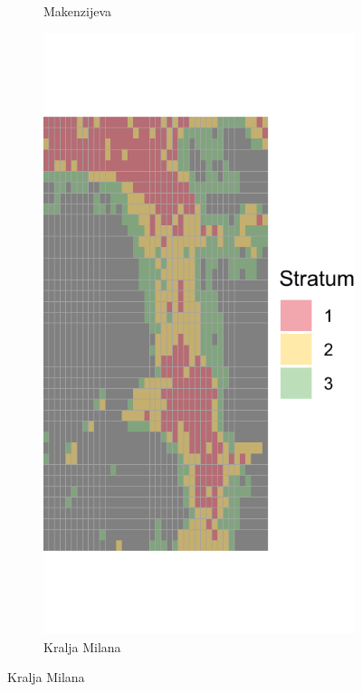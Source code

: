 \documentclass[a4paper,12pt]{article}
\begin{document}
\begin{figure}[H]
\begin{subfigure}[b]{0.3\textwidth}
	  \caption{Makenzijeva}
	  \label{fig:makenzijeva}
	\end{subfigure}
	\hfill
	\begin{subfigure}[b]{0.3\textwidth}
	  \centering
	  \includegraphics[width=\textwidth]{../outputs/grid_output/strata_viz/kralja-milana_strata.png}
	  \caption{Kralja Milana}

\end{subfigure}
\end{figure}
\end{document}
